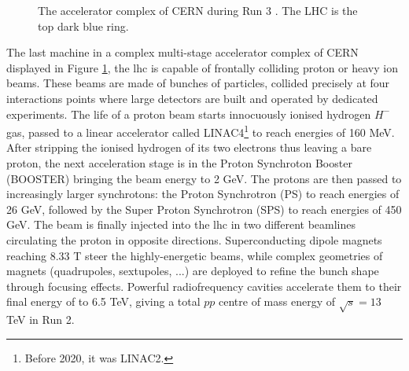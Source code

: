 \begin{figure}[!h]
  \centering
  \caption{The accelerator complex of CERN during Run 3 \cite{CERNAcc}. The LHC is the top dark blue ring.}
  \label{fig-CernAccSys}
\end{figure}

The last machine in a complex multi-stage accelerator complex of CERN displayed in Figure \ref{fig-CernAccSys}, the \gls{lhc} is capable of frontally colliding proton or heavy ion beams. These beams are made of bunches of particles, collided precisely at four interactions points where large detectors are built and operated by dedicated experiments. The life of a proton beam starts innocuously ionised hydrogen $H^-$ gas, passed to a linear accelerator called LINAC4\footnote{Before 2020, it was LINAC2.} to reach energies of 160 MeV. After stripping the ionised hydrogen of its two electrons thus leaving a bare proton, the next acceleration stage is in the Proton Synchroton Booster (BOOSTER) bringing the beam energy to 2 GeV. The protons are then passed to increasingly larger synchrotons: the Proton Synchrotron (PS) to reach energies of 26 GeV, followed by the Super Proton Synchrotron (SPS) to reach energies of 450 GeV. The beam is finally injected into the \gls{lhc} in two different beamlines circulating the proton in opposite directions. Superconducting dipole magnets reaching 8.33 T steer the highly-energetic beams, while complex geometries of magnets (quadrupoles, sextupoles, ...) are deployed to refine the bunch shape through focusing effects. Powerful radiofrequency cavities accelerate them to their final energy of to 6.5 TeV, giving a total $pp$ centre of mass energy of $\sqrt{s} = 13$ TeV in Run 2.  \\

